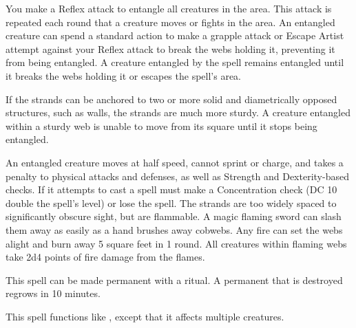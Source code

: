 \spelldur{\durshort \dismissable}
\begin{spelleffect}
    You make a Reflex attack to entangle all creatures in the area. This attack is repeated each round that a creature moves or fights in the area. An entangled creature can spend a standard action to make a grapple attack or Escape Artist attempt against your Reflex attack to break the webs holding it, preventing it from being entangled. A creature entangled by the spell remains entangled until it breaks the webs holding it or escapes the spell's area.
    \par If the strands can be anchored to two or more solid and diametrically opposed structures, such as walls, the strands are much more sturdy. A creature entangled within a sturdy web is unable to move from its square until it stops being entangled.
\end{spelleffect}
\begin{spellnotes}
    An entangled creature moves at half speed, cannot sprint or charge, and takes a  penalty to physical attacks and defenses, as well as Strength and Dexterity-based checks. If it attempts to cast a spell must make a Concentration check (DC 10 \add double the spell's level) or lose the spell.
    The strands are too widely spaced to significantly obscure sight, but are flammable. A magic flaming sword can slash them away as easily as a hand brushes away cobwebs. Any fire can set the webs alight and burn away 5 square feet in 1 round. All creatures within flaming webs take 2d4 points of fire damage from the flames.

    This spell can be made permanent with a  ritual. A permanent  that is destroyed regrows in 10 minutes.
\end{spellnotes}

\begin{spelleffect}
    This spell functions like , except that it affects multiple creatures.
\end{spelleffect}

